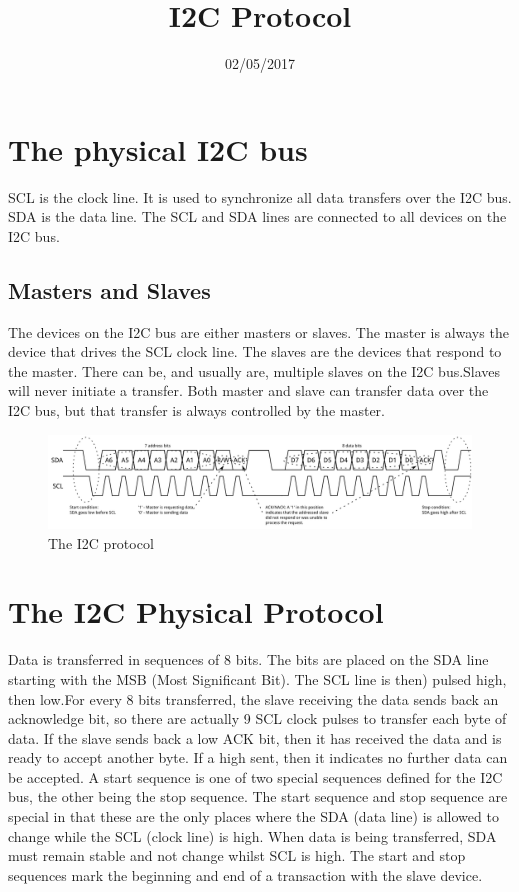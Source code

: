 \documentclass[12pt,twocolumn]{IEEEtran}
\title{I2C Protocol}
\date{02/05/2017}
\begin{document}
  \maketitle
    \section{The physical I2C bus}
    SCL is the clock line. It is used to synchronize all data transfers over the I2C bus. SDA is the data line. The SCL and SDA lines are connected to all devices 
    on the I2C bus.

  \subsection{Masters and Slaves}
      The devices on the I2C bus are either masters or slaves. The master is always the device that drives the SCL clock line. The slaves are the devices that 
      respond to the master. There can be, and usually are, multiple slaves on the I2C bus.Slaves will never initiate a transfer. Both master and slave can transfer 
      data over the I2C bus, but that transfer is always controlled by the master.

  \begin{figure}[p]
    \includegraphics[width=\textwidth]{i2c_concept.png}
    \caption{The I2C protocol}
  \end{figure}


  \section{The I2C Physical Protocol}

    Data is transferred in sequences of 8 bits. The bits are placed on the SDA line starting with the MSB (Most Significant Bit). The SCL line is then) pulsed 
high, then low.For every 8 bits transferred, the slave receiving the data sends back an acknowledge bit, so there are actually 9 SCL clock pulses to transfer 
each byte of data. If the slave sends back a low ACK bit, then it has received the data and is ready to accept another byte. If a high sent, then it indicates
no further data can be accepted. 
A start sequence is one of two special sequences defined for the I2C bus, the other being the stop sequence. The start sequence and stop sequence are special 
in that these are the only places where the SDA (data line) is allowed to change while the SCL (clock line) is high. When data is being transferred, SDA must
remain stable and not change whilst SCL is high. The start and stop sequences mark the beginning and end of a transaction with the slave device.
\end{document}
